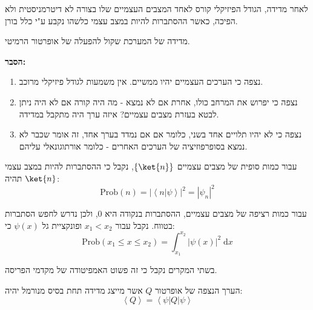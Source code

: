 \documentclass{tstextbook}
\begin{document}
\begin{theorem}[מדידה]
לאחר מדידה, הגודל הפיזיקלי קורס לאחד המצבים העצמיים שלו בצורה לא דיטרמניסטית ולא הפיכה, כאשר ההסתברות להיות במצב עצמי כלשהו נקבע ע"י כלל בורן.

\end{theorem}
\begin{proposition}
מדידה של המערכת שקול להפעלה של אופרטור הרמיטי.

\end{proposition}
\textbf{הסבר:}

\begin{enumerate}
  \item נצפה כי הערכים העצמיים יהיו ממשיים. אין משמעות לגודל פיזיקלי מרוכב. 


  \item נצפה כי יפרוש את המרחב כולו, אחרת אם לא נמצא - מה היה קורה אם לא היה ניתן לבטא בעזרת מצבים עצמיים? איזה ערך היה מתקבל במדידה.  


  \item נצפה כי לא יהיו תלויים אחד בשני, כלומר אם אם נמדד בערך אחד, זה אומר שכבר לא נמצא בסופרפוזיציה של הערכים האחרים - כלומר אורתוגונאלי עליהם. 


\end{enumerate}
\begin{proposition}
עבור כמות סופית של מצבים עצמיים \(\left\{  \ket{n}  \right\}\), נקבל כי ההסתברות להיות במצב עצמי \(\ket{n}\) תהיה:
$$\mathrm{Prob}\left(n\right)=\left|\left\langle n|\psi\right\rangle\right|^{2}=\left|\psi_{n}\right|^{2}$$

\end{proposition}
\begin{proposition}
עבור כמות רציפה של מצבים עצמיים, ההסתברות בנקודה היא 0, ולכן נדרש לחפש הסתברות בטווח. נקבל עבור \(x_{1}<x_{2}\) ופונקציית גל \(\psi(x)\) כי:
$$\mathrm{Prob}\left( x_{1}\leq x\leq x_{2} \right)= \int_{x_{1}}^{x_{2}} \lvert \psi(x) \rvert ^2\;\mathrm{d}x$$

\end{proposition}
\begin{remark}
בשתי המקרים נקבל כי זה פשוט האמפיטודה של מקדמי הפריסה.

\end{remark}
\begin{proposition}
הערך הנצפה של אופרטור \(Q\) אשר מייצג מדידה תחת בסיס מנורמל יהיה:
$$\left\langle Q\right\rangle=\left\langle\psi\right|Q\left|\psi\right\rangle$$

\end{proposition}
\end{document}
